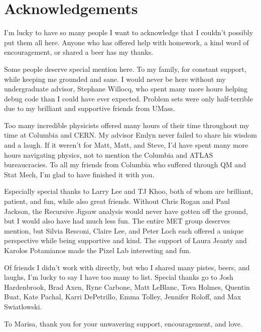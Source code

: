 \chapter*{Acknowledgements} %

I'm lucky to have so many people I want to acknowledge that I couldn't possibly put them all here.
Anyone who has offered help with homework, a kind word of encouragement, or shared a beer has my thanks.

Some people deserve special mention here.
To my family, for constant support, while keeping me grounded and sane.
I would never be here without my undergraduate advisor, Stephane Willocq, who spent many more hours helping debug code than I could have ever expected.
Problem sets were only half-terrible due to my brilliant and supportive friends from UMass.

Too many incredible physicists offered many hours of their time throughout my time at Columbia and CERN.
My advisor Emlyn never failed to share his wisdom and a laugh.
If it weren't for Matt, Matt, and Steve, I'd have spent many more hours navigating physics, not to mention the Columbia and ATLAS bureaucracies.
To all my friends from Columbia who suffered through QM and Stat Mech, I'm glad to have finished it with you.

Especially special thanks to Larry Lee and TJ Khoo, both of whom are brilliant, patient, and fun, while also great friends.
Without Chris Rogan and Paul Jackson, the Recursive Jigsaw analysis would never have gotten off the ground, but I would also have had much less fun.
The entire MET group deserves mention, but Silvia Resconi, Claire Lee, and Peter Loch each offered a unique perspective while being supportive and kind.
The support of Laura Jeanty and Karolos Potamianos made the Pixel Lab interesting and fun.

Of friends I didn't work with directly, but who I shared many pistes, beers, and laughs, I'm lucky to say I have too many to list.
Special thanks go to Josh Hardenbrook, Brad Axen, Ryne Carbone, Matt LeBlanc, Tova Holmes, Quentin Buat, Kate Pachal, Karri DePetrillo, Emma Tolley, Jennifer Roloff, and Max Swiatlowski.

To Marisa, thank you for your unwavering support, encouragement, and love.
